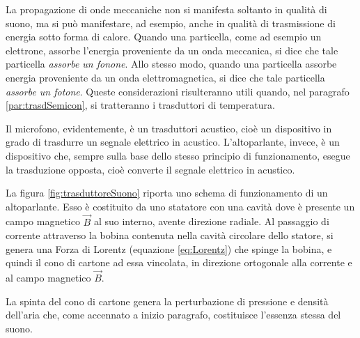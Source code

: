 \documentclass[17pt]{extarticle}
\begin{document}
La propagazione di onde meccaniche non si manifesta soltanto in qualità di suono, ma si può manifestare, ad esempio, anche in qualità di trasmissione di energia sotto forma di calore.
Quando una particella, come ad esempio un elettrone, assorbe l'energia proveniente da un onda meccanica, si dice che tale particella \emph{assorbe un fonone}. Allo stesso modo, quando una particella assorbe energia proveniente da un onda elettromagnetica, si dice che tale particella \emph{assorbe un fotone}. 
Queste considerazioni risulteranno utili quando, nel paragrafo \ref{par:trasdSemicon}, si tratteranno i trasduttori di temperatura.



























Il microfono, evidentemente, è un trasduttori acustico, cioè un dispositivo in grado di trasdurre un segnale elettrico in acustico. L'altoparlante, invece, è un dispositivo che, sempre sulla base dello stesso principio di funzionamento, esegue la trasduzione opposta, cioè converte il segnale elettrico in acustico.

La figura \ref{fig:trasduttoreSuono} riporta uno schema di funzionamento di un altoparlante. Esso è costituito da uno statatore con una cavità dove è presente un campo magnetico $\vec{B}$ al suo interno, avente direzione radiale. Al passaggio di corrente attraverso la bobina contenuta nella cavità circolare dello statore, si genera una Forza di Lorentz (equazione \ref{eq:Lorentz}) che spinge la bobina, e quindi il cono di cartone ad essa vincolata, in direzione ortogonale alla corrente e al campo magnetico $\vec{B}$.

La spinta del cono di cartone genera la perturbazione di pressione e densità dell'aria che, come accennato a inizio paragrafo, costituisce l'essenza stessa del suono.
\end{document}
